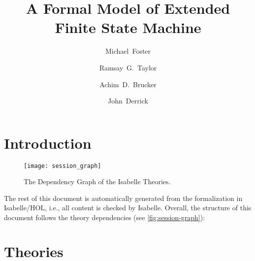 \documentclass[10pt,DIV16,a4paper,abstract=true,twoside=semi,openright]{scrreprt}
\title{A Formal Model of Extended Finite State Machine}%
\author{Michael~Foster\orcidID{0000-0001-8233-9873} \and
 Ramsay~G.~Taylor\orcidID{0000-0002-4036-7590} \and
 Achim~D.~Brucker\orcidID{0000-0002-6355-1200} \and
 John~Derrick\orcidID{0000-0002-6631-8914}}
\begin{document}
\maketitle
\begin{abstract}
  \begin{quote}

    \bigskip
  \end{quote}
\end{abstract}


\tableofcontents
\cleardoublepage

\chapter{Introduction}

\begin{figure}
  \centering
  \texttt{[image: session\_graph]}
  \caption{The Dependency Graph of the Isabelle Theories.\label{fig:session-graph}}
\end{figure}
The rest of this document is automatically generated from the
formalization in Isabelle/HOL, i.e., all content is checked by
Isabelle.  Overall, the structure of this document follows the
theory dependencies (see \autoref{fig:session-graph}):

\nocite{foster.ea:efsm:2018}

\clearpage
\chapter{Theories}




{\small
  
  
}
\end{document}
